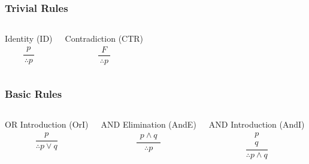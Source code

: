 \documentclass[dvipsnames]{beamer}
\begin{document}
\begin{frame}
  \frametitle{Trivial Rules}

  \begin{columns}
    \begin{block}{Identity (ID)}
      \[
      \frac
        {
          \begin{array}{c}
            p
          \end{array}
        }
        {
          \therefore p
        }
      \]
    \end{block}

    \pause
    \begin{block}{Contradiction (CTR)}
    \[
    \frac
      {
        \begin{array}{c}
          F
        \end{array}
      }
      {
        \therefore p
      }
    \]
    \end{block}
  \end{columns}
\end{frame}

\begin{frame}
  \frametitle{Basic Rules}

  \begin{columns}[t]
    \begin{block}{OR Introduction (OrI)}
      \[
      \frac
        {
          \begin{array}{c}
            p
          \end{array}
        }
        {
          \therefore p \vee q
        }
      \]
    \end{block}

    \pause
    \begin{block}{AND Elimination (AndE)}
    \[
    \frac
      {
        \begin{array}{c}
          p \wedge q
        \end{array}
      }
      {
        \therefore p
      }
    \]
    \end{block}

    \pause
    \begin{block}{AND Introduction (AndI)}
      \[
      \frac
        {
          \begin{array}{c}
            p\\
            q
          \end{array}
        }
        {
          \therefore p \wedge q
        }
      \]
    \end{block}
  \end{columns}
\end{frame}
\end{document}
